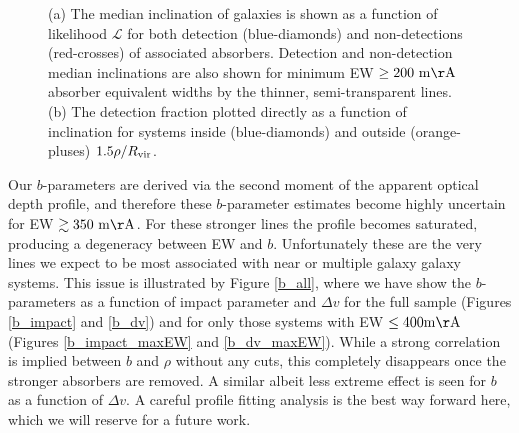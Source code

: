 \documentclass[twocolumn,tighten]{aastex62}
\begin{document}
\begin{figure}[ht!]
        \centering
        \vspace{0pt}
        \caption{\small{(a) The median inclination of galaxies is shown as a function of likelihood $\mathcal{L}$ for both detection (blue-diamonds) and non-detections (red-crosses) of associated absorbers. Detection and non-detection median inclinations are also shown for minimum EW $\rm \ge 200~ m\AA$ absorber equivalent widths by the thinner, semi-transparent lines. (b) The detection fraction plotted directly as a function of inclination for systems inside (blue-diamonds) and outside (orange-pluses) $1.5 \rho / R_{\rm vir}$.}}
        \vspace{0pt}
        \label{detection_fraction_inc_both}
\end{figure}


Our $b$-parameters are derived via the second moment of the apparent optical depth profile, and therefore these $b$-parameter estimates become highly uncertain for EW $\rm \gtrsim 350~m\AA$. For these stronger lines the profile becomes saturated, producing a degeneracy between EW and $b$. Unfortunately these are the very lines we expect to be most associated with near or multiple galaxy galaxy systems. This issue is illustrated by Figure \ref{b_all}, where we have show the $b$-parameters as a function of impact parameter and $\Delta v$  for the full sample (Figures \ref{b_impact} and \ref{b_dv}) and for only those systems with EW $\rm \leq 400 m\AA$ (Figures \ref{b_impact_maxEW} and \ref{b_dv_maxEW}). While a strong correlation is implied between $b$ and $\rho$ without any cuts, this completely disappears once the stronger absorbers are removed. A similar albeit less extreme effect is seen for $b$ as a function of $\Delta v$. A careful profile fitting analysis is the best way forward here, which we will reserve for a future work.
\end{document}
